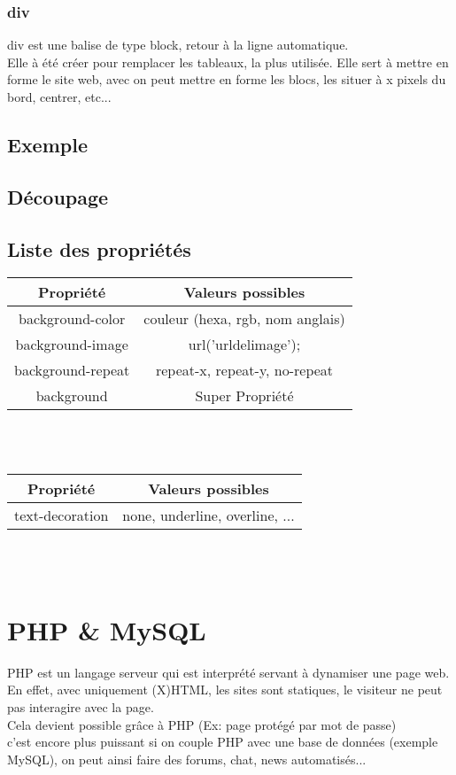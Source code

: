 \documentclass[12pt,a4paper,openany]{article}
\begin{document}
				\subsubsection{div}
				div est une balise de type block, retour à la ligne automatique.\\
				Elle à été créer pour remplacer les tableaux, la plus utilisée.
				Elle sert à mettre en forme le site web, avec on peut mettre en 
				forme les blocs, les situer à x pixels du bord, centrer, etc...
				\newpage
				\subsection{Exemple}
			
			
				\subsection{Découpage}
%				
				\subsection{Liste des propriétés}
					\begin{tabular}{|c|c|}
						\hline
							\textbf{Propriété} & \textbf{Valeurs possibles} \\
						\hline
							background-color & couleur (hexa, rgb, nom anglais)\\
						\hline
							background-image & url('urldelimage');\\
						\hline
							background-repeat & repeat-x, repeat-y, no-repeat\\
						\hline
							background & Super Propriété\\
						\hline		
					\end{tabular}\\ \\

					\begin{tabular}{|c|c|}
						\hline
							\textbf{Propriété} & \textbf{Valeurs possibles} \\
						\hline
							text-decoration & none, underline, overline, ...\\
						\hline
					\end{tabular}\\ \\
	\section{PHP \& MySQL}
		PHP est un langage serveur qui est interprété
		servant à dynamiser une page web. \\
		En effet, avec uniquement (X)HTML, les sites sont statiques, le visiteur
		ne peut pas interagire avec la page. \\
		Cela devient possible grâce à PHP (Ex: page protégé par mot de passe)\\
		c'est encore plus puissant si on couple PHP avec une base de données 
		(exemple MySQL), on peut ainsi faire des forums, 
		chat, news automatisés...\\
\end{document}
